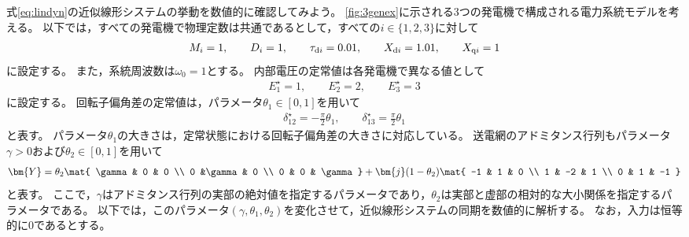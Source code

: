 \documentclass[tombow,dvipdfmx]{corona-a5}
\begin{document}
\begin{例}[近似線形システムの同期に関する数値実験]\label{ex:linsyssim}
式\ref{eq:lindyn}の近似線形システムの挙動を数値的に確認してみよう。
\ref{fig:3genex}に示される3つの発電機で構成される電力系統モデルを考える。
以下では，すべての発電機で物理定数は共通であるとして，すべての$i \in \{1,2,3\}$に対して
\begin{align*}
M_i=1
,\qquad
D_i=1
,\qquad
\tau_{{\rm d}i} = 0.01
,\qquad
X_{{\rm d}i} = 1.01
,\qquad
X_{{\rm q}i} = 1
\end{align*}
に設定する。
また，系統周波数は$\omega_0=1$とする。
内部電圧の定常値は各発電機で異なる値として
\begin{align*}
E^{\star}_1=1
,\qquad
E^{\star}_2=2
,\qquad
E^{\star}_3=3
\end{align*}
に設定する。
回転子偏角差の定常値は，パラメータ$\theta_1 \in [0, 1]$を用いて
\begin{align*}
\delta_{12}^{\star}= - \frac{\pi}{2} \theta_1
,\qquad
\delta_{13}^{\star}=  \frac{\pi}{2} \theta_1
\end{align*}
と表す。
パラメータ$\theta_1$の大きさは，定常状態における回転子偏角差の大きさに対応している。
送電網のアドミタンス行列もパラメータ$\gamma >0$および$\theta_2 \in [0,1]$を用いて
\begin{align*}
\bm{Y} =
\theta_2
\mat{
\gamma & 0 & 0 \\
0 &\gamma & 0 \\
0 & 0 & \gamma
}
 +
\bm{j} (1-\theta_2) 
\mat{
-1 & 1 & 0 \\
1 & -2 & 1 \\
0 & 1 & -1 
}
\end{align*}
と表す。
ここで，$\gamma$はアドミタンス行列の実部の絶対値を指定するパラメータであり，$\theta_2$は実部と虚部の相対的な大小関係を指定するパラメータである。
以下では，このパラメータ$(\gamma,\theta_1,\theta_2)$を変化させて，近似線形システムの同期を数値的に解析する。
なお，入力は恒等的に0であるとする。


\end{例}
\end{document}
